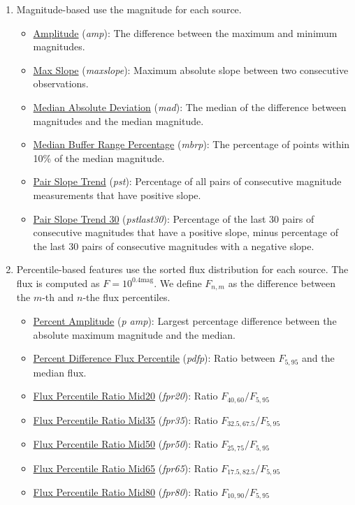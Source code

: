 \documentclass[a4paper,fleqn,usenatbib]{mnras}
\begin{document}
\begin{enumerate}
    \item Magnitude-based use the magnitude for each source.
    \begin{itemize}
    \item \underline{Amplitude} (\textit{amp}): 
      The difference between the maximum and minimum magnitudes.
    \item \underline{Max Slope} (\textit{max\textunderscore slope}): 
      Maximum absolute slope between two consecutive observations.
    \item \underline{Median Absolute Deviation} (\textit{mad}): 
      The median of the difference between magnitudes and the median
      magnitude. 
    \item \underline{Median Buffer Range Percentage} (\textit{mbrp}): 
      The percentage of points within 10\% of the median magnitude.
    \item \underline{Pair Slope Trend} (\textit{pst}): 
      Percentage of all pairs of consecutive magnitude measurements that have positive slope.
    \item \underline{Pair Slope Trend 30} (\textit{pst\textunderscore last30}): 
      Percentage of the last 30 pairs of consecutive magnitudes that have a positive slope, minus percentage of the last 30 pairs of consecutive magnitudes with a negative slope.
    \end{itemize}


  \item Percentile-based features use the sorted flux distribution for
    each source. The flux is computed as $F = 10^{0.4 \mathrm{mag}}$. 
    We define $F_{n,m}$ as the difference between the $m$-th and $n$-the flux
    percentiles. 
    \begin{itemize}
    \item \underline{Percent Amplitude} (\textit{p \textunderscore amp}): 
      Largest percentage difference between the absolute maximum magnitude and the median.
    \item \underline{Percent Difference Flux Percentile} (\textit{pdfp}): 
      Ratio between $F_{5,95}$ and the median flux.
    \item \underline{Flux Percentile Ratio Mid20} (\textit{fpr20}): 
      Ratio $F_{40,60} / F_{5,95}$
    \item \underline{Flux Percentile Ratio Mid35} (\textit{fpr35}):
        Ratio $F_{32.5,67.5} / F_{5,95}$
      \item \underline{Flux Percentile Ratio Mid50} (\textit{fpr50}): 
        Ratio $F_{25,75} / F_{5,95}$
      \item \underline{Flux Percentile Ratio Mid65} (\textit{fpr65}): 
        Ratio $F_{17.5,82.5} / F_{5,95}$
      \item \underline{Flux Percentile Ratio Mid80} (\textit{fpr80}): 
        Ratio $F_{10,90} / F_{5,95}$
    \end{itemize}
    

\end{enumerate}
\end{document}

